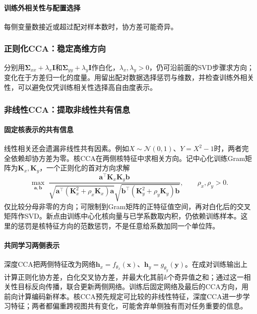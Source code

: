 \paragraph{训练外相关性与配置选择}

每侧变量数接近或超过配对样本数时，协方差可能奇异。

\subsubsection{正则化CCA：稳定高维方向}

分别用$\bm\Sigma_{xx}+\lambda_x\bm I$和$\bm\Sigma_{yy}+\lambda_y\bm I$作白化，$\lambda_x,\lambda_y>0$，仍可沿前面的SVD步骤求方向；变化在于方差归一化的度量。用留出配对数据选择惩罚与维数，并检查训练外相关性，可以避免仅凭训练相关性选择高自由度表示。

\subsubsection{非线性CCA：提取非线性共有信息}

\paragraph{固定核表示的共有信息}

线性相关还会遗漏非线性共有因素。例如$X\sim\mathcal N(0,1)$、$Y=X^2-1$时，两者完全依赖却协方差为零。核CCA在两侧核特征中求相关方向。记中心化训练Gram矩阵为$\bm K_x,\bm K_y$，一个正则化的首对方向求解
\[
 \max_{\bm a,\bm b}\;
 \frac{\bm a^\top\bm K_x\bm K_y\bm b}
 {\sqrt{\bm a^\top(\bm K_x^2+\rho_x\bm K_x)\bm a}
  \sqrt{\bm b^\top(\bm K_y^2+\rho_y\bm K_y)\bm b}},
 \qquad \rho_x,\rho_y>0.
\]
仅比较分母非零的方向；可限制到Gram矩阵的正特征值空间，再对白化后的交叉矩阵作SVD。新点由训练中心化核向量与已学系数取内积，仍依赖训练样本。这里的惩罚是核特征方向的范数惩罚，不是任意给系数加同一个单位阵。

\paragraph{共同学习两侧表示}

深度CCA把两侧特征改为网络$\bm h_x=f_{\theta_x}(\bm x)$、$\bm h_y=g_{\theta_y}(\bm y)$。在成对训练输出上计算正则化协方差，白化交叉协方差，并最大化其前$k$个奇异值之和；通过这一相关性目标反向传播，联合更新两侧网络。训练后固定网络及最后的CCA方向，用前向计算编码新样本。核CCA预先规定可比较的非线性特征，深度CCA进一步学习特征；两者都偏重跨视图共有变化，可能舍弃单侧独有而对任务重要的信息。

